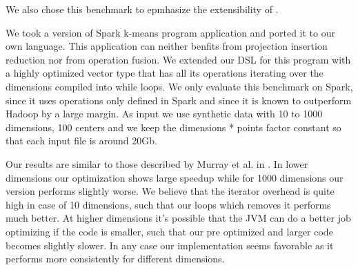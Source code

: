 We also chose this benchmark to epmhasize the extensibility of \tool.

We took a version of Spark k-means program  application and ported it to our own language. This application can neither benfits from projection insertion reduction nor from operation fusion. We extended our DSL for this program with a highly optimized vector type that has all its operations iterating over the dimensions compiled into while loops. We only evaluate this benchmark on Spark, since it uses operations only defined in Spark and since it is known to outperform Hadoop by a large margin. As input we use synthetic data with 10 to 1000 dimensions, 100 centers and we keep the dimensions * points factor constant so that each input file is around 20Gb.

Our results are similar to those described by Murray et al. in \cite{murray_steno:_2011}. In lower dimensions our optimization shows large speedup while for 1000 dimensions our version performs slightly worse. We believe that the iterator overhead is quite high in case of 10 dimensions, such that our loops which removes it performs much better. At higher dimensions it's possible that the JVM can do a better job optimizing if the code is smaller, such that our pre optimized and larger code becomes slightly slower. In any case our implementation seems favorable as it performs more consistently for different dimensions.
